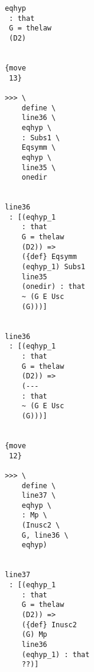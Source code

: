 \documentclass[12pt]{article}
\begin{document}
\begin{verbatim}
                                       eqhyp 
                                        : that 
                                        G = thelaw 
                                        (D2)


                                       {move 
                                        13}

                                       >>> \
                                           define \
                                           line36 \
                                           eqhyp \
                                           : Subs1 \
                                           Eqsymm \
                                           eqhyp \
                                           line35 \
                                           onedir


                                       line36 
                                        : [(eqhyp_1 
                                           : that 
                                           G = thelaw 
                                           (D2)) => 
                                           ({def} Eqsymm 
                                           (eqhyp_1) Subs1 
                                           line35 
                                           (onedir) : that 
                                           ~ (G E Usc 
                                           (G)))]


                                       line36 
                                        : [(eqhyp_1 
                                           : that 
                                           G = thelaw 
                                           (D2)) => 
                                           (--- 
                                           : that 
                                           ~ (G E Usc 
                                           (G)))]


                                       {move 
                                        12}

                                       >>> \
                                           define \
                                           line37 \
                                           eqhyp \
                                           : Mp \
                                           (Inusc2 \
                                           G, line36 \
                                           eqhyp)


                                       line37 
                                        : [(eqhyp_1 
                                           : that 
                                           G = thelaw 
                                           (D2)) => 
                                           ({def} Inusc2 
                                           (G) Mp 
                                           line36 
                                           (eqhyp_1) : that 
                                           ??)]



\end{verbatim}
\end{document}
